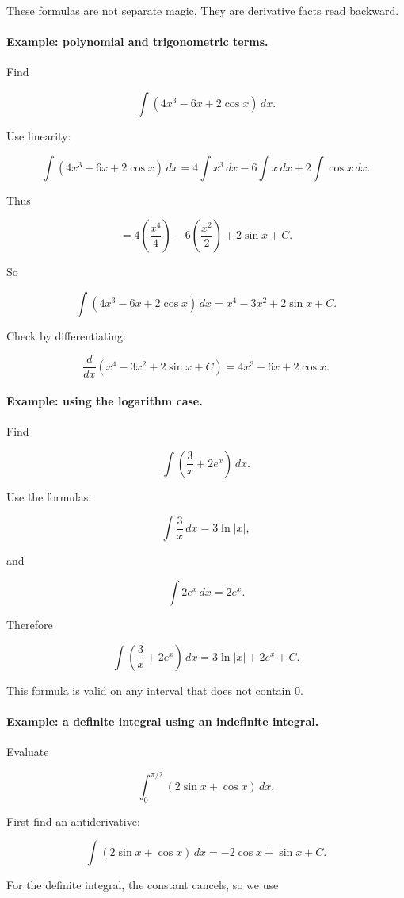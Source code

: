 These formulas are not separate magic.  They are derivative facts read backward.

\paragraph{Example: polynomial and trigonometric terms.}
Find

\[
\int (4x^3-6x+2\cos x)\,dx.
\]

Use linearity:

\[
\int (4x^3-6x+2\cos x)\,dx
=
4\int x^3\,dx
-
6\int x\,dx
+
2\int \cos x\,dx.
\]

Thus

\[
=4\left(\frac{x^4}{4}\right)
-
6\left(\frac{x^2}{2}\right)
+
2\sin x
+
C.
\]

So

\[
\boxed{
\int (4x^3-6x+2\cos x)\,dx
=
x^4-3x^2+2\sin x+C.
}
\]

Check by differentiating:

\[
\frac{d}{dx}(x^4-3x^2+2\sin x+C)
=
4x^3-6x+2\cos x.
\]

\paragraph{Example: using the logarithm case.}
Find

\[
\int \left(\frac3x+2e^x\right)\,dx.
\]

Use the formulas:

\[
\int \frac3x\,dx=3\ln|x|,
\]

and

\[
\int 2e^x\,dx=2e^x.
\]

Therefore

\[
\boxed{
\int \left(\frac3x+2e^x\right)\,dx
=
3\ln|x|+2e^x+C.
}
\]

This formula is valid on any interval that does not contain \(0\).

\paragraph{Example: a definite integral using an indefinite integral.}
Evaluate

\[
\int_0^{\pi/2} (2\sin x+\cos x)\,dx.
\]

First find an antiderivative:

\[
\int (2\sin x+\cos x)\,dx
=
-2\cos x+\sin x+C.
\]

For the definite integral, the constant cancels, so we use

